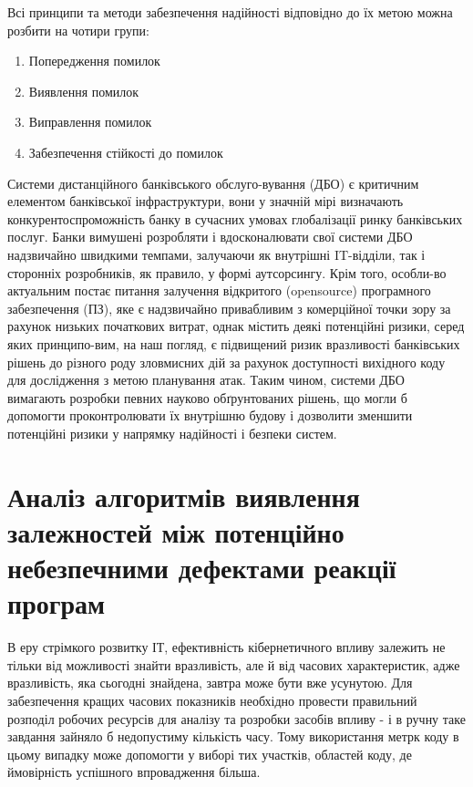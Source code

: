 \documentclass[oneside,final,14pt]{extreport}
\begin{document}
Всі принципи та методи забезпечення надійності відповідно до їх метою можна розбити на чотири групи:
\begin{enumerate}
\item {} 
Попередження помилок

\item {} 
Виявлення помилок

\item {} 
Виправлення помилок

\item {} 
Забезпечення стійкості до помилок

\end{enumerate}

Системи дистанційного банківського обслуго-вування (ДБО) є критичним елементом банківської інфраструктури, вони у значній мірі визначають конкурентоспроможність банку в сучасних умовах глобалізації ринку банківських послуг. Банки вимушені розробляти і вдосконалювати свої системи ДБО надзвичайно швидкими темпами, залучаючи як внутрішні IT-відділи, так і сторонніх розробників, як правило, у формі аутсорсингу. Крім того, особли-во актуальним постає питання залучення відкритого (opensource) програмного забезпечення (ПЗ), яке є надзвичайно привабливим з комерційної точки зору за рахунок низьких початкових витрат, однак містить деякі потенційні ризики, серед яких принципо-вим, на наш погляд, є підвищений ризик вразливості банківських рішень до різного роду зловмисних дій за рахунок доступності вихідного коду для дослідження з метою планування атак. Таким чином, системи ДБО вимагають розробки певних науково обґрунтованих рішень, що могли б допомогти проконтролювати їх внутрішню будову і дозволити зменшити потенційні ризики у напрямку надійності і безпеки систем.


\section{Аналіз алгоритмів виявлення залежностей між потенційно небезпечними дефектами реакції програм}
\label{2section:id8}
В еру стрімкого розвитку ІТ, ефективність кібернетичного впливу залежить не тільки від можливості знайти вразливість, але й від часових характеристик, адже вразливість, яка сьогодні знайдена, завтра може бути вже усунутою. Для забезпечення кращих часових показників необхідно провести правильний розподіл робочих ресурсів для аналізу та розробки засобів впливу - і в ручну таке завдання зайняло б недопустиму кількість часу. Тому використання метрк коду в цьому випадку може допомогти у виборі тих участків, областей коду, де ймовірність успішного впровадження більша.
\end{document}
